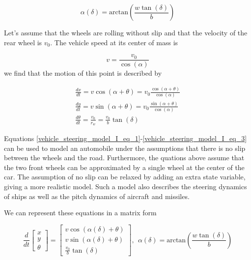 \begin{equation}
\alpha(\delta) = \text{arctan}(\frac{w\tan(\delta)}{b})
\end{equation}

Let's assume that the wheels are rolling without slip and that the velocity of the rear
wheel is $v_0$. The vehicle speed at its center of mass is 

\begin{equation}
v = \frac{v_0}{\cos(\alpha)}
\end{equation}
we find that the motion of this point is described  by

\begin{eqnarray}
\frac{dx}{dt} = v\cos(\alpha + \theta) = v_0 \frac{\cos(\alpha + \theta)}{\cos(\alpha)} \label{vehicle_steering_model_I_eq_1}\\
\frac{dy}{dt} = v\sin(\alpha + \theta) = v_0 \frac{\sin(\alpha + \theta)}{\cos(\alpha)} \label{vehicle_steering_model_I_eq_2}\\
\frac{d\theta}{dt} = \frac{v_0}{r_w} = \frac{v_0}{b} \tan(\delta) 
\label{vehicle_steering_model_I_eq_3}
\end{eqnarray}


Equations \ref{vehicle_steering_model_I_eq_1}-\ref{vehicle_steering_model_I_eq_3} can be used to model an automobile under the 
assumptions that there is no slip between the wheels and the road. Furthermore, the quations above
assume that the two front wheels can be approximated by a single wheel at the center of the car. 
The assumption of no slip can be relaxed by adding an extra state variable, giving a more
realistic model. Such a model also describes the steering dynamics of ships as well
as the pitch dynamics of aircraft and missiles.

We can represent these equations in a matrix form 

\begin{equation}
\frac{d}{dt}
\begin{bmatrix}
 x \\
 y  \\
 \theta 
\end{bmatrix} =
\begin{bmatrix}
 v\cos(\alpha(\delta) + \theta) \\
 v\sin(\alpha(\delta) + \theta)  \\
 \frac{v_0}{b} \tan(\delta) 
\end{bmatrix}, ~~ \alpha(\delta) = \text{arctan}(\frac{w\tan(\delta)}{b})
\end{equation}


